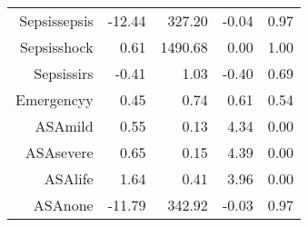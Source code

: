 \begin{tabular}{rrrrr}
$$  Sepsis\-sepsis & -12.44 & 327.20 & -0.04 & 0.97 \\ 
  Sepsis\-shock & 0.61 & 1490.68 & 0.00 & 1.00 \\ 
  Sepsis\-sirs & -0.41 & 1.03 & -0.40 & 0.69 \\ 
  Emergency\-y & 0.45 & 0.74 & 0.61 & 0.54 \\ 
  ASA\-mild & 0.55 & 0.13 & 4.34 & 0.00 \\ 
  ASA\-severe & 0.65 & 0.15 & 4.39 & 0.00 \\ 
  ASA\-life & 1.64 & 0.41 & 3.96 & 0.00 \\ 
  ASA\-none & -11.79 & 342.92 & -0.03 & 0.97 \\ 
   \hline
\end{tabular}

\bigskip\bigskip
\centering
